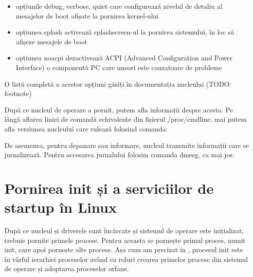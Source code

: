 \begin{itemize}
	\item opțiunile debug, verbose, quiet care configurează nivelul de
		detaliu al mesajelor de boot afișate la pornirea kernel-ului
	\item opțiunea splash activează splashscreen-ul la pornirea sistemului,
		în loc să afișeze mesajele de boot
	\item opțiunea noacpi dezactivează ACPI  (Advanced Configuration and
		Power Interface) o componentă PC care uneori este cauzatoare de
		probleme
\end{itemize}

O listă completă a acestor opțiuni găsiți în documentația nucleului (TODO:
footnote)

După ce nucleul de operare a pornit, putem afla informații despre acesta. Pe
lângă aflarea liniei de comandă echivalente din fișierul /proc/cmdline, mai
putem afla versiunea nucleului care rulează folosind comanda:


De asemenea, pentru depanare sau informare, nucleul transmite informații care se
jurnalizează. Pentru accesarea jurnalului folosim comanda dmesg, ca mai jos:


\section{Pornirea init și a serviciilor de startup în Linux}
\label{sec:boot-init-linux}

După ce nucleul și driverele sunt încărcate și sistemul de operare este
inițializat, trebuie pornite primele procese. Pentru aceasta se pornește primul
proces, numit init, care apoi pornește alte procese. Așa cum am precizat în
, procesul init este în vârful
ierarhiei proceselor având ca roluri crearea primelor procese din sistemul de
operare și adoptarea proceselor orfane.

